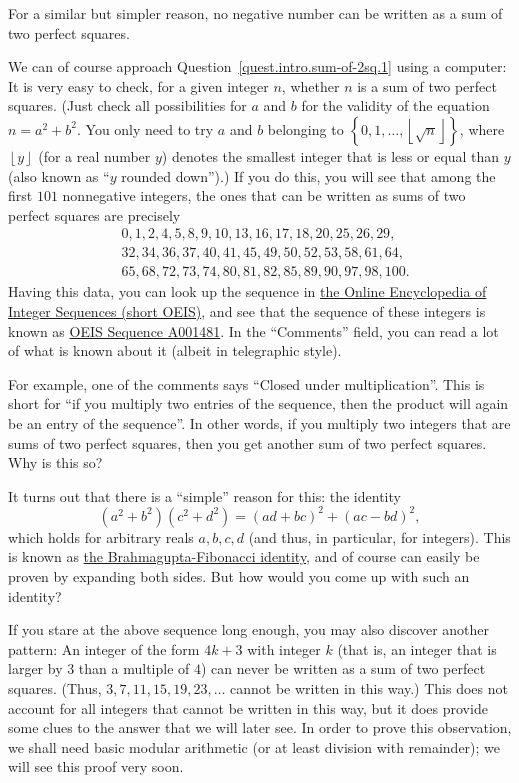 \documentclass[numbers=enddot,12pt,final,onecolumn,notitlepage]{scrartcl}%
\numberwithin{exer}{section}
\theoremstyle{definition}
\newcommand{\set}[1]{\left\{ #1 \right\}}
\newcommand{\floor}[1]{\left\lfloor #1 \right\rfloor}
\begin{document}
For a similar but simpler reason, no negative number can be written as
a sum of two perfect squares.

We can of course approach Question~\ref{quest.intro.sum-of-2sq.1}
using a computer: It is very easy to check, for a given integer $n$, whether
$n$ is a sum of two perfect squares. (Just check all possibilities for $a$ and
$b$ for the validity of the equation $n = a^2 + b^2$. You only need to try
$a$ and $b$ belonging to $\set{0, 1, \ldots, \floor{\sqrt{n}}}$, where $\floor{y}$
(for a real number $y$) denotes the smallest integer that is less or equal than $y$
(also known as ``$y$ rounded down'').)
If you do this, you will see that among the first $101$ nonnegative integers,
the ones that can be written as sums of two perfect squares are precisely
\begin{align*}
 & 0, 1, 2, 4, 5, 8, 9, 10, 13, 16, 17, 18, 20, 25, 26, 29, \\
 & 32, 34, 36, 37, 40, 41, 45, 49, 50, 52, 53, 58, 61, 64, \\
 & 65, 68, 72, 73, 74, 80, 81, 82, 85, 89, 90, 97, 98, 100 .
\end{align*}
Having this data, you can look up the sequence in
\href{https://oeis.org/}{the Online Encyclopedia of Integer Sequences (short OEIS)},
and see that the sequence of these integers is known as
\href{https://oeis.org/A001481}{OEIS Sequence A001481}.
In the ``Comments'' field, you can read a lot of what is known about it
(albeit in telegraphic style).

For example, one of the comments says ``Closed under multiplication''.
This is short for ``if you multiply two entries of the sequence, then
the product will again be an entry of the sequence''.
In other words, if you multiply two integers that are sums of two perfect
squares, then you get another sum of two perfect squares.
Why is this so?

It turns out that there is a ``simple'' reason for this: the identity
\[
 \left(  a^{2}+b^{2}\right)  \left(  c^{2}+d^{2}\right)  =\left(
 ad+bc\right)  ^{2}+\left(  ac-bd\right)  ^{2} ,
\]
which holds for arbitrary reals $a,b,c,d$ (and thus, in particular,
for integers).
This is known as
\href{https://en.wikipedia.org/wiki/Brahmagupta-Fibonacci_identity}{the Brahmagupta-Fibonacci identity},
and of course can easily be proven by expanding both sides.
But how would you come up with such an identity?

If you stare at the above sequence long enough, you may also discover
another pattern: An integer of the form $4k+3$ with integer $k$
(that is, an integer that is larger by $3$ than a multiple of $4$)
can never be written as a sum of two perfect squares.
(Thus, $3, 7, 11, 15, 19, 23, \ldots$ cannot be written in this way.)
This does not account for all integers that cannot be written in this
way, but it does provide some clues to the answer that we will later
see.
In order to prove this observation, we shall need basic modular
arithmetic (or at least division with remainder); we will see this
proof very soon.
\end{document}
